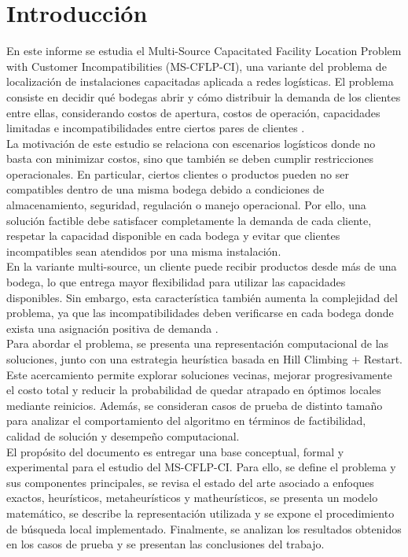 \section{Introducción}

\noindent En este informe se estudia el Multi-Source Capacitated Facility Location Problem with Customer Incompatibilities (MS-CFLP-CI), una variante del problema de localización de instalaciones capacitadas aplicada a redes logísticas. El problema consiste en decidir qué bodegas abrir y cómo distribuir la demanda de los clientes entre ellas, considerando costos de apertura, costos de operación, capacidades limitadas e incompatibilidades entre ciertos pares de clientes \cite{klose2005facility,maia2023metaheuristic}.\\

\noindent La motivación de este estudio se relaciona con escenarios logísticos donde no basta con minimizar costos, sino que también se deben cumplir restricciones operacionales. En particular, ciertos clientes o productos pueden no ser compatibles dentro de una misma bodega debido a condiciones de almacenamiento, seguridad, regulación o manejo operacional. Por ello, una solución factible debe satisfacer completamente la demanda de cada cliente, respetar la capacidad disponible en cada bodega y evitar que clientes incompatibles sean atendidos por una misma instalación.\\

\noindent En la variante multi-source, un cliente puede recibir productos desde más de una bodega, lo que entrega mayor flexibilidad para utilizar las capacidades disponibles. Sin embargo, esta característica también aumenta la complejidad del problema, ya que las incompatibilidades deben verificarse en cada bodega donde exista una asignación positiva de demanda \cite{mansini2022kernel,ceschia2024multineighborhood}.\\

\noindent Para abordar el problema, se presenta una representación computacional de las soluciones, junto con una estrategia heurística basada en Hill Climbing + Restart. Este acercamiento permite explorar soluciones vecinas, mejorar progresivamente el costo total y reducir la probabilidad de quedar atrapado en óptimos locales mediante reinicios. Además, se consideran casos de prueba de distinto tamaño para analizar el comportamiento del algoritmo en términos de factibilidad, calidad de solución y desempeño computacional.\\

\noindent El propósito del documento es entregar una base conceptual, formal y experimental para el estudio del MS-CFLP-CI. Para ello, se define el problema y sus componentes principales, se revisa el estado del arte asociado a enfoques exactos, heurísticos, metaheurísticos y matheurísticos, se presenta un modelo matemático, se describe la representación utilizada y se expone el procedimiento de búsqueda local implementado. Finalmente, se analizan los resultados obtenidos en los casos de prueba y se presentan las conclusiones del trabajo.